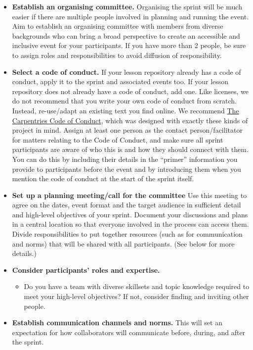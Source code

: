 \documentclass[
]{book}
\providecommand{\tightlist}{%
  \setlength{\itemsep}{0pt}\setlength{\parskip}{0pt}}
\begin{document}
\begin{itemize}
\item
  \textbf{Establish an organising committee.} Organising the sprint will be much easier if there are multiple people involved in planning and running the event.
  Aim to establish an organising committee with members from diverse backgrounds who can bring a broad perspective to create an accessible and inclusive event for your participants.
  If you have more than 2 people, be sure to assign roles and responsibilities to avoid diffusion of responsibility.
\item
  \textbf{Select a code of conduct.} If your lesson repository already has a code of conduct,
  apply it to the sprint and associated events too.
  If your lesson repository does not already have a code of conduct, add one.
  Like licenses, we do not recommend that you write your own code of conduct from scratch.
  Instead, re-use/adapt an existing text you find online.
  We recommend \href{https://docs.carpentries.org/topic_folders/policies/code-of-conduct.html}{The Carpentries Code of Conduct},
  which was designed with exactly these kinds of project in mind.
  Assign at least one person as the contact person/facilitator for
  matters relating to the Code of Conduct,
  and make sure all sprint participants are aware of who this is and how they should connect with them.
  You can do this by including their details in the ``primer'' information
  you provide to participants before the event
  and by introducing them when you mention the code of conduct
  at the start of the sprint itself.
\item
  \textbf{Set up a planning meeting/call for the committee} Use this meeting to agree on the dates, event format and
  the target audience in sufficient detail and high-level objectives of your sprint.
  Document your discussions and plans in a central location so that everyone involved in the process can access them.
  Divide responsibilities to put together resources (such as for communication and norms) that will be shared with all participants. (See below for more details.)
\item
  \textbf{Consider participants' roles and expertise.}

  \begin{itemize}
  \tightlist
  \item
    Do you have a team with diverse skillsets and topic knowledge required to meet your high-level objectives? If not, consider finding and inviting other people.
  \end{itemize}
\item
  \textbf{Establish communication channels and norms.} This will set an expectation for how collaborators will communicate before, during, and after the sprint.


\end{itemize}
\end{document}
